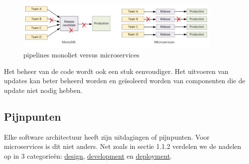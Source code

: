 \begin{figure}[!htb]
    \caption{pipelines monoliet versus microservices}
    \centering
    \includegraphics[width=0.9\textwidth]{PipelinesVS.png}    
\end{figure}

Het beheer van de code wordt ook een stuk eenvoudiger. Het uitvoeren van updates kan beter beheerd worden en geïsoleerd worden van componenten die de update niet nodig hebben.


\subsection{Pijnpunten}

Elke software architectuur heeft zijn uitdagingen of pijnpunten. Voor microservices is dit niet anders. Net zoals in sectie 1.1.2 verdelen we de nadelen op in 3 categorieën: \underline{design}, \underline{development} en \underline{deployment}.\\ \\

